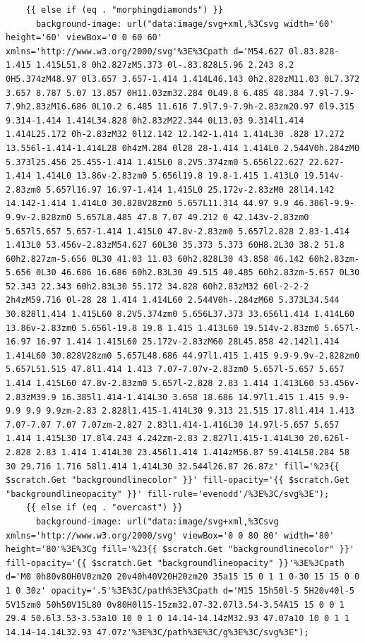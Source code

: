 \documentclass[11pt]{article}
\begin{document}
\begin{enumerate}
\begin{verbatim}
    {{ else if (eq . "morphingdiamonds") }}
      background-image: url("data:image/svg+xml,%3Csvg width='60' height='60' viewBox='0 0 60 60' xmlns='http://www.w3.org/2000/svg'%3E%3Cpath d='M54.627 0l.83.828-1.415 1.415L51.8 0h2.827zM5.373 0l-.83.828L5.96 2.243 8.2 0H5.374zM48.97 0l3.657 3.657-1.414 1.414L46.143 0h2.828zM11.03 0L7.372 3.657 8.787 5.07 13.857 0H11.03zm32.284 0L49.8 6.485 48.384 7.9l-7.9-7.9h2.83zM16.686 0L10.2 6.485 11.616 7.9l7.9-7.9h-2.83zm20.97 0l9.315 9.314-1.414 1.414L34.828 0h2.83zM22.344 0L13.03 9.314l1.414 1.414L25.172 0h-2.83zM32 0l12.142 12.142-1.414 1.414L30 .828 17.272 13.556l-1.414-1.414L28 0h4zM.284 0l28 28-1.414 1.414L0 2.544V0h.284zM0 5.373l25.456 25.455-1.414 1.415L0 8.2V5.374zm0 5.656l22.627 22.627-1.414 1.414L0 13.86v-2.83zm0 5.656l19.8 19.8-1.415 1.413L0 19.514v-2.83zm0 5.657l16.97 16.97-1.414 1.415L0 25.172v-2.83zM0 28l14.142 14.142-1.414 1.414L0 30.828V28zm0 5.657L11.314 44.97 9.9 46.386l-9.9-9.9v-2.828zm0 5.657L8.485 47.8 7.07 49.212 0 42.143v-2.83zm0 5.657l5.657 5.657-1.414 1.415L0 47.8v-2.83zm0 5.657l2.828 2.83-1.414 1.413L0 53.456v-2.83zM54.627 60L30 35.373 5.373 60H8.2L30 38.2 51.8 60h2.827zm-5.656 0L30 41.03 11.03 60h2.828L30 43.858 46.142 60h2.83zm-5.656 0L30 46.686 16.686 60h2.83L30 49.515 40.485 60h2.83zm-5.657 0L30 52.343 22.343 60h2.83L30 55.172 34.828 60h2.83zM32 60l-2-2-2 2h4zM59.716 0l-28 28 1.414 1.414L60 2.544V0h-.284zM60 5.373L34.544 30.828l1.414 1.415L60 8.2V5.374zm0 5.656L37.373 33.656l1.414 1.414L60 13.86v-2.83zm0 5.656l-19.8 19.8 1.415 1.413L60 19.514v-2.83zm0 5.657l-16.97 16.97 1.414 1.415L60 25.172v-2.83zM60 28L45.858 42.142l1.414 1.414L60 30.828V28zm0 5.657L48.686 44.97l1.415 1.415 9.9-9.9v-2.828zm0 5.657L51.515 47.8l1.414 1.413 7.07-7.07v-2.83zm0 5.657l-5.657 5.657 1.414 1.415L60 47.8v-2.83zm0 5.657l-2.828 2.83 1.414 1.413L60 53.456v-2.83zM39.9 16.385l1.414-1.414L30 3.658 18.686 14.97l1.415 1.415 9.9-9.9 9.9 9.9zm-2.83 2.828l1.415-1.414L30 9.313 21.515 17.8l1.414 1.413 7.07-7.07 7.07 7.07zm-2.827 2.83l1.414-1.416L30 14.97l-5.657 5.657 1.414 1.415L30 17.8l4.243 4.242zm-2.83 2.827l1.415-1.414L30 20.626l-2.828 2.83 1.414 1.414L30 23.456l1.414 1.414zM56.87 59.414L58.284 58 30 29.716 1.716 58l1.414 1.414L30 32.544l26.87 26.87z' fill='%23{{ $scratch.Get "backgroundlinecolor" }}' fill-opacity='{{ $scratch.Get "backgroundlineopacity" }}' fill-rule='evenodd'/%3E%3C/svg%3E");
    {{ else if (eq . "overcast") }}
      background-image: url("data:image/svg+xml,%3Csvg xmlns='http://www.w3.org/2000/svg' viewBox='0 0 80 80' width='80' height='80'%3E%3Cg fill='%23{{ $scratch.Get "backgroundlinecolor" }}' fill-opacity='{{ $scratch.Get "backgroundlineopacity" }}'%3E%3Cpath d='M0 0h80v80H0V0zm20 20v40h40V20H20zm20 35a15 15 0 1 1 0-30 15 15 0 0 1 0 30z' opacity='.5'%3E%3C/path%3E%3Cpath d='M15 15h50l-5 5H20v40l-5 5V15zm0 50h50V15L80 0v80H0l15-15zm32.07-32.07l3.54-3.54A15 15 0 0 1 29.4 50.6l3.53-3.53a10 10 0 1 0 14.14-14.14zM32.93 47.07a10 10 0 1 1 14.14-14.14L32.93 47.07z'%3E%3C/path%3E%3C/g%3E%3C/svg%3E");

\end{verbatim}
\end{enumerate}
\end{document}
